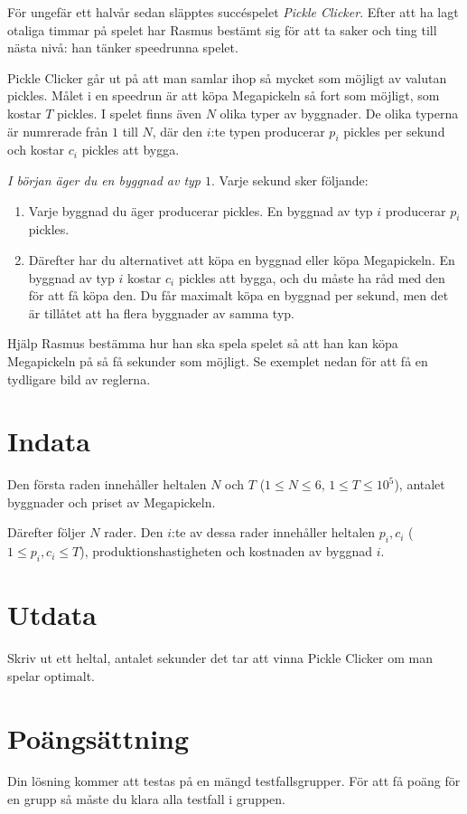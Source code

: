 \noindent

För ungefär ett halvår sedan släpptes succéspelet \emph{Pickle Clicker}. 
Efter att ha lagt otaliga timmar på spelet har Rasmus bestämt sig för att ta 
saker och ting till nästa nivå: han tänker speedrunna spelet. 

Pickle Clicker går ut på att man samlar ihop så mycket som möjligt av valutan pickles. 
Målet i en speedrun är att köpa Megapickeln så fort som möjligt, som kostar $T$ pickles. 
I spelet finns även $N$ olika typer av byggnader. De olika typerna är numrerade från 
$1$ till $N$, där den $i$:te typen producerar $p_i$ pickles per sekund och kostar 
$c_i$ pickles att bygga.

\textit{I början äger du en byggnad av typ $1$}. Varje sekund sker följande: 
\begin{enumerate}
  \item Varje byggnad du äger producerar pickles. En byggnad av typ $i$ producerar $p_i$ pickles.
  \item Därefter har du alternativet att köpa en byggnad eller köpa Megapickeln. En byggnad av typ $i$ kostar 
  $c_i$ pickles att bygga, och du måste ha råd med den för att få köpa den. Du får maximalt köpa en byggnad 
  per sekund, men det är tillåtet att ha flera byggnader av samma typ.
\end{enumerate}

Hjälp Rasmus bestämma hur han ska spela spelet så att han kan köpa Megapickeln på så få sekunder som möjligt.
Se exemplet nedan för att få en tydligare bild av reglerna.

\section*{Indata}
Den första raden innehåller heltalen $N$ och $T$ ($1 \le N \le 6$, $1 \leq T \leq 10^5$),
antalet byggnader och priset av Megapickeln.

Därefter följer $N$ rader. Den $i$:te av dessa rader innehåller heltalen $p_i, c_i$
($1 \leq p_i,c_i \leq T$), produktionshastigheten och kostnaden av byggnad $i$.

\section*{Utdata}
Skriv ut ett heltal, antalet sekunder det tar att vinna Pickle Clicker om man spelar optimalt.

\section*{Poängsättning}
Din lösning kommer att testas på en mängd testfallsgrupper.
För att få poäng för en grupp så måste du klara alla testfall i gruppen.

